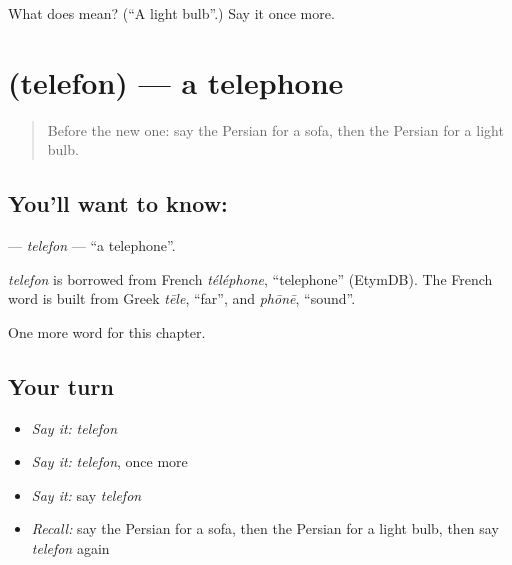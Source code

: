 \begin{tcolorbox}[breakable,colback=teal!4,colframe=teal!35!black,title={Before you move on}]
What does  mean? (\textquotedblleft{}A light bulb\textquotedblright{}.) Say it once more.
\end{tcolorbox}
\section[\texorpdfstring{\fa{تلفن} (telefon)}{تلفن (telefon)}]{ (telefon) — a telephone}

\label{lesson:FA-C110-telefon}



\begin{quote}
Before the new one: say the Persian for a sofa, then the Persian for a light bulb.
\end{quote}

\subsection*{You'll want to know: }
\textbf{} — \emph{telefon} — \textquotedblleft{}a telephone\textquotedblright{}.

\begin{cousinweb}
\emph{telefon} is borrowed from French \emph{téléphone}, \textquotedblleft{}telephone\textquotedblright{} (EtymDB). The French word is built from Greek \emph{tēle}, \textquotedblleft{}far\textquotedblright{}, and \emph{phōnē}, \textquotedblleft{}sound\textquotedblright{}.
\end{cousinweb}

\begin{grammarlens}[title={What you've built}]
One more word for this chapter.
\end{grammarlens}

\subsection*{Your turn}
\begin{itemize}
\raggedright
  \item \emph{Say it:} \emph{telefon}
  \item \emph{Say it:} \emph{telefon}, once more
  \item \emph{Say it:} say \emph{telefon}
  \item \emph{Recall:} say the Persian for a sofa, then the Persian for a light bulb, then say \emph{telefon} again
\end{itemize}


